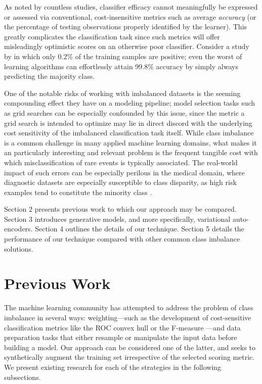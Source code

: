 \documentclass[twoside,11pt]{article}
\begin{document}
As noted by countless studies, classifier efficacy cannot meaningfully be expressed or assessed via conventional, cost-insensitive metrics such as average \emph{accuracy} (or the percentage of testing observations properly identified by the learner). This greatly complicates the classification task since such metrics will offer misleadingly optimistic scores on an otherwise poor classifier. Consider a study by \cite{lewis1994heterogeneous} in which only 0.2\% of the training samples are positive; even the worst of learning algorithms can effortlessly attain 99.8\% accuracy by simply always predicting the majority class.

One of the notable risks of working with imbalanced datasets is the seeming compounding effect they have on a modeling pipeline; model selection tasks such as grid searches can be especially confounded by this issue, since the metric a grid search is intended to optimize may lie in direct discord with the underlying cost sensitivity of the imbalanced classification task itself. While class imbalance is a common challenge in many applied machine learning domains, what makes it an particularly interesting and relevant problem is the frequent tangible cost with which misclassification of rare events is typically associated. The real-world impact of such errors can be especially perilous in the medical domain, where diagnostic datasets are especially susceptible to class disparity, as high risk examples tend to constitute the minority class \citep{rahman2013addressing}.

Section 2 presents previous work to which our approach may be compared. Section 3 introduces generative models, and more specifically, variational auto-encoders. Section 4 outlines the details of our technique. Section 5 details the performance of our technique compared with other common class imbalance solutions. \\

\section{Previous Work}

The machine learning community has attempted to address the problem of class imbalance in several ways: weighting---such as the development of cost-sensitive classification metrics like the ROC convex hull \citep{provost2001robust} or the F-measure \citep{lewis1994training}---and data preparation tasks that either resample or manipulate the input data before building a model. Our approach can be considered one of the latter, and seeks to synthetically augment the training set irrespective of the selected scoring metric. We present existing research for each of the strategies in the following subsections.
\end{document}
